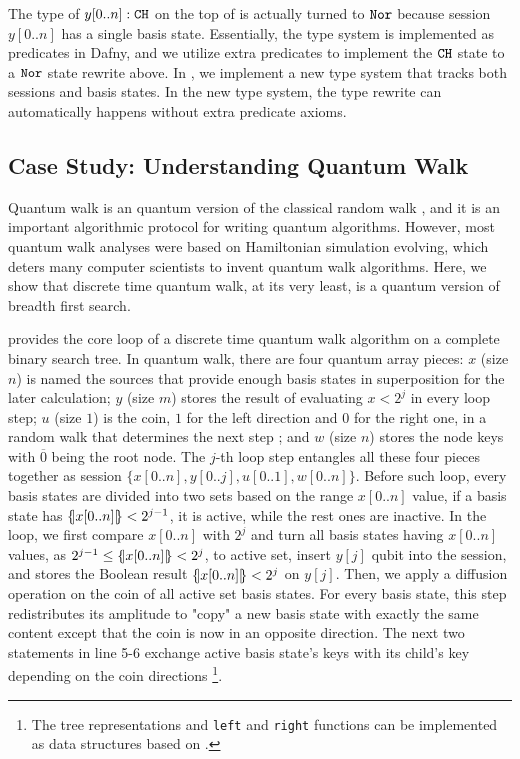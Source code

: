 The type of $y[0..n]:\texttt{CH}$ on the top of  is actually turned to $\texttt{Nor}$ because session $y[0..n]$ has a single basis state. Essentially, the \qafny type system is implemented as predicates in Dafny, and we utilize extra predicates to implement the $\texttt{CH}$ state to a $\texttt{Nor}$ state rewrite above. In , we implement a new type system that tracks both sessions and basis states. In the new type system, the type rewrite can automatically happens without extra predicate axioms.

\subsection{Case Study: Understanding Quantum Walk}

Quantum walk \cite{Wong_2022,ChildsNAND,Venegas_Andraca_2012} is an quantum version of the classical random walk \cite{RayleighThePO}, and it is an important algorithmic protocol for writing quantum algorithms. However, most quantum walk analyses were based on Hamiltonian simulation evolving, which deters many computer scientists to invent quantum walk algorithms. Here, we show that discrete time quantum walk, at its very least, is a quantum version of breadth first search. 

 provides the core loop of a discrete time quantum walk algorithm on a complete binary search tree. In quantum walk, there are four quantum array pieces: $x$ (size $n$) is named the sources that provide enough basis states in superposition for the later calculation; $y$ (size $m$) stores the result of evaluating $x<2^j$ in every loop step; $u$ (size $1$) is the coin, $1$ for the left direction and $0$ for the right one, in a random walk that determines the next step ; and $w$ (size $n$) stores the node keys with $\overline{0}$ being the root node. The $j$-th loop step entangles all these four pieces together
as session $\{x[0..n],y[0..j],u[0..1],w[0..n]\}$. Before such loop, every basis states are divided into two sets based on the range $x[0..n]$ value, if a basis state has $\{\hspace{-0.2em}| x[0..n] |\hspace{-0.2em}\}<2^{j-1}$, it is active, while the rest ones are inactive. In the loop, we first compare $x[0..n]$ with $2^j$ and turn all basis states having $x[0..n]$ values, as $2^{j-1} \le \{\hspace{-0.2em}| x[0..n] |\hspace{-0.2em}\}<2^{j}$, to active set, insert $y[j]$ qubit into the session, and stores the Boolean result $\{\hspace{-0.2em}| x[0..n] |\hspace{-0.2em}\}<2^{j}$ on $y[j]$.
Then, we apply a diffusion operation on the coin of all active set basis states. For every basis state, this step redistributes its amplitude to "copy" a new basis state with exactly the same content except that the coin is now in an opposite direction. 
The next two statements in  line 5-6 exchange active basis state's keys with its child's key depending on the coin directions \footnote{The tree representations and \texttt{left} and \texttt{right} functions can be implemented as data structures based on \oqasm.}.


